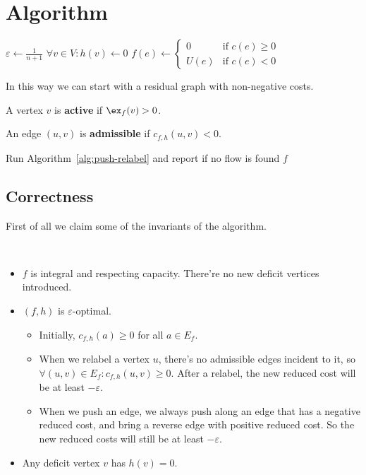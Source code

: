 \section{Algorithm}
\begin{algorithm}
	\caption{Init}
	$\varepsilon \gets \frac{1}{n+1}$\;
	$\forall v \in V: h(v) \gets 0$\;
	$f(e) \gets \begin{cases}
			0    & \text{if } c(e) \ge 0 \\
			U(e) & \text{if } c(e) < 0
		\end{cases}$\;
\end{algorithm}
In this way we can start with a residual graph with non-negative costs.

\begin{definition}
	A vertex $v$ is \textbf{active} if $\ex_f(v) > 0$.

	An edge $(u,v)$ is \textbf{admissible} if $c_{f,h}(u,v) < 0$.
\end{definition}

\begin{algorithm}[h]
	\caption{Min Cost Flow}\label{alg:min-cost-flow}
	Run Algorithm~\ref{alg:push-relabel} and report if no flow is found\;
	\Return $f$\;
\end{algorithm}

\subsection{Correctness}

First of all we claim some of the invariants of the algorithm.

\begin{lemma}
	$ $
	\begin{itemize}
		\item $f$ is integral and respecting capacity. There're no new deficit vertices introduced.
		\item $(f,h)$ is $\varepsilon$-optimal.
		      \begin{itemize}
			      \item Initially, $c_{f,h}(a) \ge 0$ for all $a \in E_f$.
			      \item When we relabel a vertex $u$, there's no admissible edges incident to it, so $\forall (u,v) \in E_f: c_{f,h}(u,v) \ge 0$. After a relabel, the new reduced cost will be at least $-\varepsilon$.
			      \item When we push an edge, we always push along an edge that has a negative reduced cost, and bring a reverse edge with positive reduced cost. So the new reduced costs will still be at least $-\varepsilon$.
		      \end{itemize}
		\item Any deficit vertex $v$ has $h(v) = 0$.
	\end{itemize}
\end{lemma}

